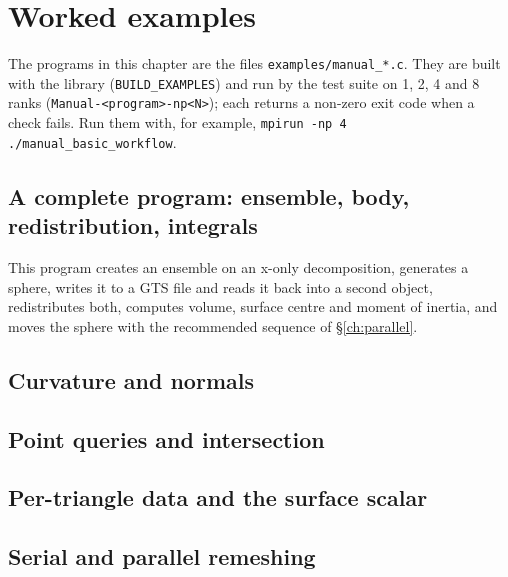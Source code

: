 \chapter{Worked examples}
\label{ch:examples}

The programs in this chapter are the files \texttt{examples/manual\_*.c}. They are built with the
library (\texttt{BUILD\_EXAMPLES}) and run by the test suite on 1, 2, 4 and 8 ranks
(\texttt{Manual-<program>-np<N>}); each returns a non-zero exit code when a check fails. Run them with,
for example, \texttt{mpirun -np 4 ./manual\_basic\_workflow}.

\section{A complete program: ensemble, body, redistribution, integrals}
\label{sec:ex-basic}

This program creates an ensemble on an x-only decomposition, generates a sphere, writes it to a
GTS file and reads it back into a second object, redistributes both, computes volume, surface
centre and moment of inertia, and moves the sphere with the recommended sequence of
\S\ref{ch:parallel}.



\section{Curvature and normals}
\label{sec:ex-curvature}



\section{Point queries and intersection}
\label{sec:ex-queries}



\section{Per-triangle data and the surface scalar}
\label{sec:ex-data}



\section{Serial and parallel remeshing}
\label{sec:ex-remesh}

